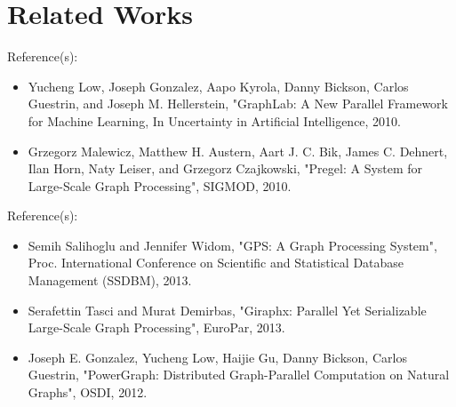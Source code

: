 \section{Related Works}

\begin{frame}{Reference(s):}
\begin{itemize}
 \item Yucheng Low, Joseph Gonzalez, Aapo Kyrola, Danny Bickson, Carlos Guestrin, and Joseph M. Hellerstein, "GraphLab: A New Parallel Framework for Machine Learning, In Uncertainty in Artificial Intelligence, 2010.
 \item Grzegorz Malewicz, Matthew H. Austern, Aart J. C. Bik, James C. Dehnert, Ilan Horn,
Naty Leiser, and Grzegorz Czajkowski, "Pregel: A System for Large-Scale Graph Processing", SIGMOD, 2010.
    \end{itemize}
\end{frame}


\begin{frame}{Reference(s):}
\begin{itemize}
\item Semih Salihoglu and Jennifer Widom, "GPS: A Graph Processing System", Proc. International Conference on Scientific and Statistical Database Management (SSDBM), 2013.
\item Serafettin Tasci and Murat Demirbas, "Giraphx: Parallel Yet Serializable Large-Scale Graph Processing", EuroPar, 2013.
\item Joseph E. Gonzalez, Yucheng Low, Haijie Gu, Danny Bickson, Carlos Guestrin, "PowerGraph: Distributed Graph-Parallel Computation on Natural Graphs", OSDI, 2012.
    \end{itemize}
\end{frame}
